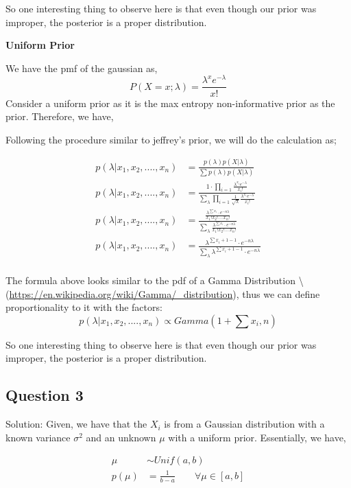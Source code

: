 \documentclass[]{article}
\begin{document}
So one interesting thing to observe here is that even though our prior
was improper, the posterior is a proper distribution.

\textbf{Uniform Prior}

We have the pmf of the gaussian as,
\[P(X = x; \lambda) = \frac{\lambda^x e^{-\lambda}}{x!}\] Consider a
uniform prior as it is the max entropy non-informative prior as the
prior. Therefore, we have,

Following the procedure similar to jeffrey's prior, we will do the
calculation as;

\begin{align*}
    p(\lambda | x_1, x_2,...., x_n) &= \frac{p(\lambda) p(X|\lambda)}{\sum p(\lambda) p(X|\lambda)} \\
    p(\lambda | x_1, x_2,...., x_n) &= \frac{1 \cdot \prod_{i=1} \frac{\lambda^{x_i}e^{-\lambda}}{x_i!}}{\sum_{\lambda}\prod_{i=1} \frac{1}{\sqrt{\lambda} }\frac{\lambda^{x_i}e^{-\lambda}}{x_i!}} \\
    p(\lambda | x_1, x_2,...., x_n) &= \frac{\frac{\lambda^{\sum x_i}\cdot e^{-n\lambda}}{x_1!x_2!....x_n!}}{\sum_{\lambda} \frac{\lambda^{\sum x_i}\cdot e^{-n\lambda}}{x_1!x_2!....x_n!}} \\
    p(\lambda | x_1, x_2,...., x_n) &= \frac{\lambda^{\sum x_i + 1 - 1}\cdot e^{-n\lambda}}{\sum_{\lambda} \lambda^{\sum x_i + 1 - 1}\cdot e^{-n\lambda}} \\
\end{align*}

The formula above looks similar to the pdf of a Gamma Distribution
\textbackslash{}
(\url{https://en.wikipedia.org/wiki/Gamma/_distribution}), thus we can
define proportionality to it with the factors:
\[p(\lambda | x_1, x_2,...., x_n) \propto Gamma\left(1 + \sum x_i, n\right)\]

So one interesting thing to observe here is that even though our prior
was improper, the posterior is a proper distribution.

\subsection{Question 3}\label{question-3}

Solution: Given, we have that the \(X_i\) is from a Gaussian
distribution with a known variance \(\sigma^2\) and an unknown \(\mu\)
with a uniform prior. Essentially, we have,

\begin{align*}
    \mu &\sim Unif(a,b) \\
    p(\mu) &= \frac{1}{b-a} \qquad \forall \mu \in [a,b]
\end{align*}
\end{document}
